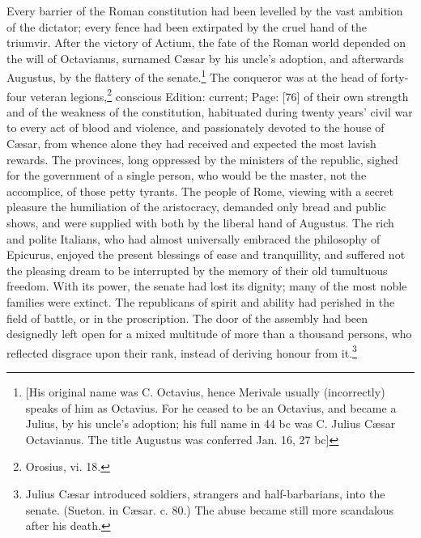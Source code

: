 Every barrier of the Roman constitution had been levelled by the vast ambition of the dictator; every fence had been extirpated by the cruel hand of the triumvir. After the victory of Actium, the fate of the Roman world depended on the will of Octavianus, surnamed Cæsar by his uncle\texthebrew{}’s adoption, and afterwards Augustus, by the flattery of the senate.\footnote{[His original name was C. Octavius, hence Merivale usually (incorrectly) speaks of him as Octavius. For he ceased to be an Octavius, and became a Julius, by his uncle\texthebrew{}’s adoption; his full name in 44 bc was C. Julius Cæsar Octavianus. The title Augustus was conferred Jan. 16, 27 bc]} The conqueror was at the head of forty-four veteran legions,\footnote{Orosius, vi. 18.} conscious Edition: current; Page: [76] of their own strength and of the weakness of the constitution, habituated during twenty years\texthebrew{}’ civil war to every act of blood and violence, and passionately devoted to the house of Cæsar, from whence alone they had received and expected the most lavish rewards. The provinces, long oppressed by the ministers of the republic, sighed for the government of a single person, who would be the master, not the accomplice, of those petty tyrants. The people of Rome, viewing with a secret pleasure the humiliation of the aristocracy, demanded only bread and public shows, and were supplied with both by the liberal hand of Augustus. The rich and polite Italians, who had almost universally embraced the philosophy of Epicurus, enjoyed the present blessings of ease and tranquillity, and suffered not the pleasing dream to be interrupted by the memory of their old tumultuous freedom. With its power, the senate had lost its dignity; many of the most noble families were extinct. The republicans of spirit and ability had perished in the field of battle, or in the proscription. The door of the assembly had been designedly left open for a mixed multitude of more than a thousand persons, who reflected disgrace upon their rank, instead of deriving honour from it.\footnote{Julius Cæsar introduced soldiers, strangers and half-barbarians, into the senate. (Sueton. in Cæsar. c. 80.) The abuse became still more scandalous after his death.}

